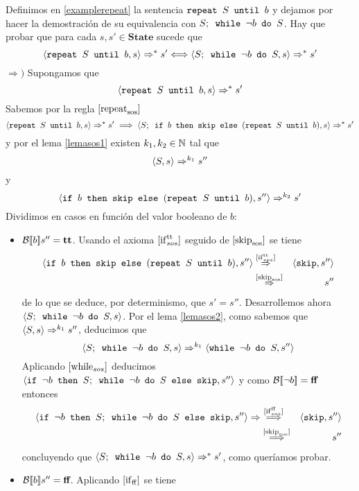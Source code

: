\begin{example} Definimos en \ref{examplerepeat} la sentencia $\texttt{repeat }S\texttt{ until }b$ y dejamos por hacer la demostración de su equivalencia con $S;\texttt{ while }\neg b\texttt{ do } S$. Hay que probar que para cada $s, s'\in\textbf{State}$ sucede que
\[
    \langle \texttt{repeat }S\texttt{ until }b, s \rangle \Rightarrow^* s' \Longleftrightarrow \langle S;\texttt{ while }\neg b\texttt{ do } S, s \rangle \Rightarrow^* s'
\]
$\Longrightarrow)$ Supongamos que  
\[
    \langle \texttt{repeat }S\texttt{ until }b, s \rangle \Rightarrow^* s'
\]
Sabemos por la regla $[\mathrm{repeat}_{\mathrm{sos}}]$
\[
    \langle \texttt{repeat }S\texttt{ until }b, s \rangle \Rightarrow^* s'  \implies \langle S;\texttt{ if }b\texttt{ then skip else }(\texttt{repeat }S\texttt{ until }b), s \rangle \Rightarrow^* s'
\]
y por el lema \ref{lemasos1} existen $k_1, k_2\in\mathbb{N}$ tal que
\[
    \langle S, s \rangle \Rightarrow^{k_1} s''
\]
y
\[
    \langle \texttt{if }b\texttt{ then skip else }(\texttt{repeat }S\texttt{ until }b), s'' \rangle \Rightarrow^{k_2} s'
\]
Dividimos en casos en función del valor booleano de $b$:
\begin{itemize}
    \item $\mathcal{B}[\![b]\!]s'' = \textbf{tt}$. Usando el axioma $[\mathrm{if}^{\mathrm{tt}}_{sos}]$ seguido de $[\mathrm{skip}_{\mathrm{sos}}]$ se tiene
    \begin{eqnarray*}
        \langle \texttt{if }b\texttt{ then skip else }(\texttt{repeat }S\texttt{ until }b), s'' \rangle &\overset{[\mathrm{if}^{\mathrm{tt}}_{sos}]}{\Rightarrow}& \langle \texttt{skip}, s'' \rangle \\
        &\overset{[\mathrm{skip}_{\mathrm{sos}}]}{\Rightarrow}& s''
    \end{eqnarray*}
    de lo que se deduce, por determinismo, que  $s' = s''$.
    Desarrollemos ahora $\langle S;\texttt{ while }\neg b\texttt{ do } S, s \rangle$. Por el lema \ref{lemasos2}, como sabemos que $\langle S, s \rangle \Rightarrow^{k_1} s''$, deducimos que
    \[
        \langle S;\texttt{ while }\neg b\texttt{ do } S, s \rangle \Rightarrow^{k_1} \langle \texttt{while }\neg b\texttt{ do } S, s'' \rangle
    \]
    Aplicando $[\mathrm{while}_{sos}]$ deducimos $\langle \texttt{if }\neg b\texttt{ then } S;\texttt{ while }\neg b\texttt{ do }S\texttt{ else skip}, s'' \rangle$ y como $\mathcal{B}[\![\neg b]\!] = \textbf{ff}$ entonces
    \begin{eqnarray*}
            \langle \texttt{if }\neg b\texttt{ then } S;\texttt{ while }\neg b\texttt{ do }S\texttt{ else skip}, s'' \rangle \Rightarrow &\overset{[\mathrm{if}^{\mathrm{ff}}_{sos}]}{\implies}& \langle \texttt{skip}, s'' \rangle \\
            &\overset{[\mathrm{skip}_{\mathrm{sos}}]}{\implies}& s''
    \end{eqnarray*}
    concluyendo que $\langle S;\texttt{ while }\neg b\texttt{ do } S, s \rangle \Rightarrow^* s'$, como queríamos probar.
    \item $\mathcal{B}[\![b]\!]s'' = \textbf{ff}$. Aplicando $[\mathrm{if}_{\mathrm{ff}}]$ se tiene
    \begin{eqnarray*}

\end{eqnarray*}
\end{itemize}
\end{example}
